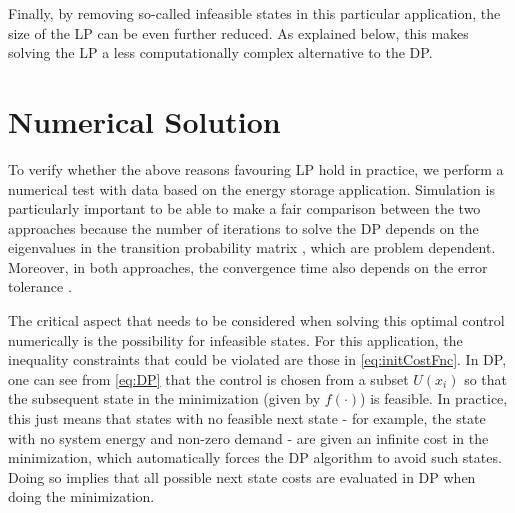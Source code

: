 \documentclass[conference]{IEEEtran}
\begin{document}


Finally, by removing so-called infeasible states in this particular application, the size of the LP can be even further reduced. As explained below, this makes solving the LP a less computationally complex alternative to the DP.

\section{Numerical Solution}
To verify whether the above reasons favouring LP hold in practice, we perform a numerical test with data based on the energy storage application. Simulation is particularly important to be able to make a fair comparison between the two approaches because the number of iterations to solve the DP depends on the eigenvalues in the transition probability matrix \cite{Bertsekas:2007:DPO:1396348}, which are problem dependent. Moreover, in both approaches, the convergence time also depends on the error tolerance \cite{Bertsekas:2007:DPO:1396348}.

The critical aspect that needs to be considered when solving this optimal control numerically is the possibility for infeasible states. For this application, the inequality constraints that could be violated are those in \eqref{eq:initCostFnc}. In DP, one can see from \eqref{eq:DP} that the control is chosen from a subset $U(x_{i})$ so that the subsequent state in the minimization (given by $f(\cdot)$) is feasible. In practice, this just means that states with no feasible next state - for example, the state with no system energy and non-zero demand - are given an infinite cost in the minimization, which automatically forces the DP algorithm to avoid such states. Doing so implies that all possible next state costs are evaluated in DP when doing the minimization.
\end{document}
